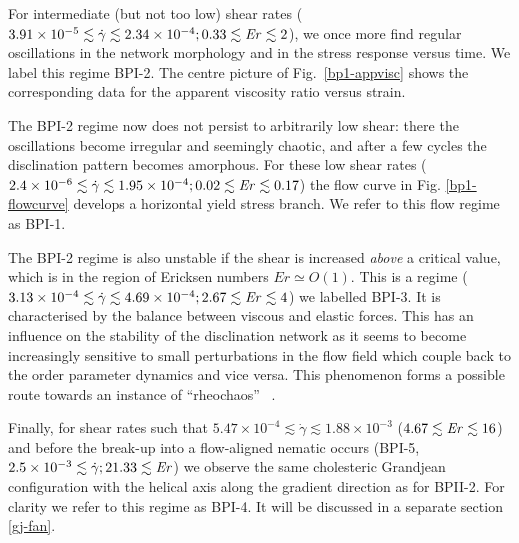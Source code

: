 \documentclass[8.5pt,twoside,twocolumn]{article}
\newcommand{\e}[1]{\times10^{#1}}
\newcommand{\gd}{\dot{\gamma}}
\begin{document}
For intermediate (but not too low) shear rates
($3.91\e{-5}\lesssim\gd\lesssim 2.34\e{-4}; 0.33\lesssim {\it Er} \lesssim 2$), we once more 
find regular oscillations in the network morphology and in the stress
response versus time. We label this regime BPI-2. 
The centre picture of Fig.~\ref{bp1-appvisc} shows the corresponding data for the
apparent viscosity ratio versus strain.

The BPI-2 regime now does not persist to arbitrarily low shear: there the
oscillations become irregular and seemingly chaotic, and after a few
cycles the disclination pattern becomes amorphous.
For these low shear rates 
($2.4\e{-6}\lesssim\gd\lesssim 1.95\e{-4}; 0.02\lesssim {\it Er} \lesssim 0.17$) 
the flow curve in Fig. \ref{bp1-flowcurve}
develops a horizontal yield stress branch. 
We refer to this flow regime as BPI-1.

The BPI-2 regime is also unstable if the shear is increased {\em above} 
a critical value, 
which is in the region of Ericksen numbers $Er \simeq O(1)$.
This is a regime 
($3.13\e{-4}\lesssim\gd\lesssim 4.69\e{-4}; 2.67\lesssim {\it Er} \lesssim 4$) 
we labelled BPI-3. It is characterised by the balance between viscous and elastic forces.
This has an influence on the stability of the disclination network as it 
seems to become increasingly sensitive to small perturbations in the flow field
which couple back to the order parameter dynamics and vice versa. This phenomenon forms 
a possible route towards an instance of ``rheochaos'' ~\cite{rheochaos,Cates:2002}.

Finally, for shear rates such that
$5.47\e{-4}\lesssim\gd\lesssim1.88\e{-3}$ ($4.67\lesssim {\it Er} \lesssim 16$) 
and before the break-up into a flow-aligned nematic occurs 
(BPI-5, $2.5\e{-3}\lesssim\gd; 21.33\lesssim {\it Er}$) 
we observe the same cholesteric Grandjean configuration with the 
helical axis along the gradient direction as for BPII-2. 
For clarity we refer to this regime as BPI-4. It will be discussed 
in a separate section \ref{gj-fan}. 
\end{document}
